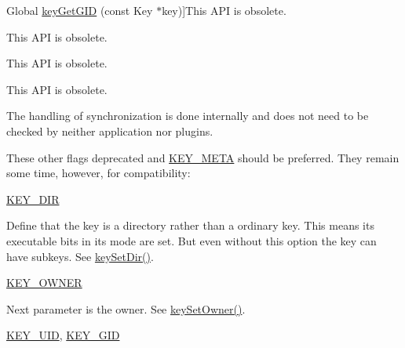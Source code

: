 \begin{DoxyRefList}
Global \hyperlink{group__meta_ga46a95e81d7d7f4e3eb59e60e5f3738c0}{key\-Get\-G\-I\-D} (const Key $\ast$key)]This A\-P\-I is obsolete. 
\item[\label{deprecated__deprecated000016}%
\hypertarget{deprecated__deprecated000016}{}%
Global \hyperlink{group__meta_gabc0cec592ce3b77e9bc33dbc8e8f6bdc}{key\-Get\-Mode} (const Key $\ast$key)]This A\-P\-I is obsolete. 
\item[\label{deprecated__deprecated000020}%
\hypertarget{deprecated__deprecated000020}{}%
Global \hyperlink{group__meta_ga57689eb5691679071463b777ae786ae9}{key\-Get\-M\-Time} (const Key $\ast$key)]This A\-P\-I is obsolete. 
\item[\label{deprecated__deprecated000011}%
\hypertarget{deprecated__deprecated000011}{}%
Global \hyperlink{group__meta_gacaa5060e67b03f50ae49a3620c54bc46}{key\-Get\-U\-I\-D} (const Key $\ast$key)]This A\-P\-I is obsolete. 
\item[\label{deprecated__deprecated000010}%
\hypertarget{deprecated__deprecated000010}{}%
Global \hyperlink{group__keytest_gaf247df0de7aca04b32ef80e39ef12950}{key\-Need\-Sync} (const Key $\ast$key)]The handling of synchronization is done internally and does not need to be checked by neither application nor plugins. 
\item[\label{deprecated__deprecated000008}%
\hypertarget{deprecated__deprecated000008}{}%
Global \hyperlink{group__key_gad23c65b44bf48d773759e1f9a4d43b89}{key\-New} (const char $\ast$name,...)]These other flags deprecated and \hyperlink{group__key_gga91fb3178848bd682000958089abbaf40a040582834bb2d90049947d7ef74e87e2}{K\-E\-Y\-\_\-\-M\-E\-T\-A} should be preferred. They remain some time, however, for compatibility\-:
\begin{DoxyItemize}
\item \hyperlink{group__key_gga91fb3178848bd682000958089abbaf40a9e43e47c8a21478538e2d20e049981d5}{K\-E\-Y\-\_\-\-D\-I\-R} \par
 Define that the key is a directory rather than a ordinary key. This means its executable bits in its mode are set. But even without this option the key can have subkeys. See \hyperlink{group__meta_gaae575bd86a628a15ee45baa860522e75}{key\-Set\-Dir()}.
\item \hyperlink{group__key_gga91fb3178848bd682000958089abbaf40a77ca60362fa8daca8d5347db4385068b}{K\-E\-Y\-\_\-\-O\-W\-N\-E\-R} \par
 Next parameter is the owner. See \hyperlink{group__meta_ga88d6ec200ba0707b7c1b4a88133d2be4}{key\-Set\-Owner()}.
\item \hyperlink{group__key_gga91fb3178848bd682000958089abbaf40a28f01a87d65f065172f734c9c9446c0e}{K\-E\-Y\-\_\-\-U\-I\-D}, \hyperlink{group__key_gga91fb3178848bd682000958089abbaf40ac0628bbaba7c837ca73323681393d15f}{K\-E\-Y\-\_\-\-G\-I\-D} \par

\end{DoxyItemize}
\end{DoxyRefList}
